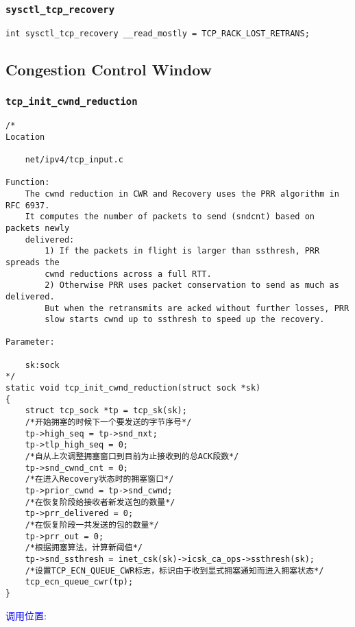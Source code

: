         \subsubsection{\texttt{sysctl_tcp_recovery}}

\begin{verbatim}
int sysctl_tcp_recovery __read_mostly = TCP_RACK_LOST_RETRANS;
\end{verbatim}

    \subsection{Congestion Control Window}
        \subsubsection{\texttt{tcp_init_cwnd_reduction}}
            \label{CongestionControlWindow:tcp_init_cwnd_reduction}
\begin{verbatim}
/* 
Location

    net/ipv4/tcp_input.c

Function:
    The cwnd reduction in CWR and Recovery uses the PRR algorithm in RFC 6937.
    It computes the number of packets to send (sndcnt) based on packets newly
    delivered:
        1) If the packets in flight is larger than ssthresh, PRR spreads the
        cwnd reductions across a full RTT.
        2) Otherwise PRR uses packet conservation to send as much as delivered.
        But when the retransmits are acked without further losses, PRR
        slow starts cwnd up to ssthresh to speed up the recovery.

Parameter:

    sk:sock
*/
static void tcp_init_cwnd_reduction(struct sock *sk)
{
    struct tcp_sock *tp = tcp_sk(sk);
    /*开始拥塞的时候下一个要发送的字节序号*/
    tp->high_seq = tp->snd_nxt;
    tp->tlp_high_seq = 0;
    /*自从上次调整拥塞窗口到目前为止接收到的总ACK段数*/
    tp->snd_cwnd_cnt = 0;
    /*在进入Recovery状态时的拥塞窗口*/
    tp->prior_cwnd = tp->snd_cwnd;
    /*在恢复阶段给接收者新发送包的数量*/
    tp->prr_delivered = 0;
    /*在恢复阶段一共发送的包的数量*/
    tp->prr_out = 0;
    /*根据拥塞算法，计算新阈值*/
    tp->snd_ssthresh = inet_csk(sk)->icsk_ca_ops->ssthresh(sk);
    /*设置TCP_ECN_QUEUE_CWR标志，标识由于收到显式拥塞通知而进入拥塞状态*/
    tcp_ecn_queue_cwr(tp);
}
\end{verbatim}
        \textcolor{blue}{调用位置}:

